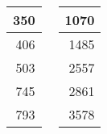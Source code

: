 \documentclass[dvipsnames]{beamer}
\theoremstyle{plain}
\begin{document}
\begin{frame}[fragile]
\begin{example}
\begin{columns}[b]
      \begin{tiny}
      \begin{table}
        \begin{tabular}{|r|}\hline
                350\\\hline
                406\\\hline
                503\\\hline
                745\\\hline
                793\\\hline
        \end{tabular}
      \end{table}
      \end{tiny}

      \begin{tiny}
      \begin{table}
        \begin{tabular}{|r|}\hline
               1070\\\hline
               1485\\\hline
               2557\\\hline
               2861\\\hline
               3578\\\hline
        \end{tabular}
      \end{table}
      \end{tiny}
    \end{columns}
  \end{example}
\end{frame}
\end{document}
